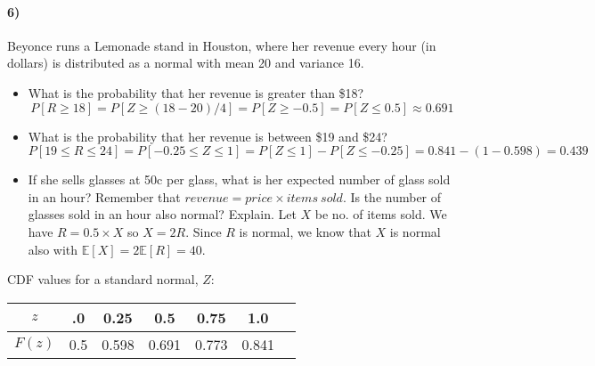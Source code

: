 \documentclass[12pt]{article}
\newcommand\EE{\mathbb{E}}
\numberwithin{equation}{section}
\numberwithin{figure}{section}
\numberwithin{table}{section}
\begin{document}
\paragraph{6)} Beyonce runs a Lemonade stand in Houston, where her revenue every hour (in dollars) is distributed as a normal with mean 20 and variance 16.
\begin{itemize}
\item What is the probability that her revenue is greater than \$18?
{\color{blue} \[P[R\geq 18] = P[Z\geq (18-20)/4] = P[Z\geq -0.5] = P[Z\leq 0.5] \approx 0.691\]}
\item What is the probability that her revenue is between \$19 and \$24?
{\color{blue} \[P[19\leq R\leq 24] = P[-0.25 \leq Z \leq 1] = P[Z\leq 1] - P[Z\leq -0.25] = 0.841-(1-0.598) = 0.439 \]}
\item If she sells glasses at 50c per glass, what is her expected number of glass sold in an hour? Remember that $revenue = price\times{items\ sold}$. Is the number of glasses sold in an hour also normal? Explain.
{\color{blue} Let $X$ be no. of items sold. We have $R = 0.5\times X$ so $X = 2R$. Since $R$ is normal, we know that $X$ is normal also with $\EE[X] = 2\EE[R] = 40$. }
\end{itemize}
CDF values for a standard normal, $Z$:
\begin{center}
\begin{tabular}{ccccccc}
$z$ & .0 & 0.25 & 0.5 & 0.75 & 1.0 \\ \hline
$F(z)$ &  0.5 & 0.598 & 0.691 & 0.773 & 0.841
\end{tabular}
\end{center}
\end{document}
